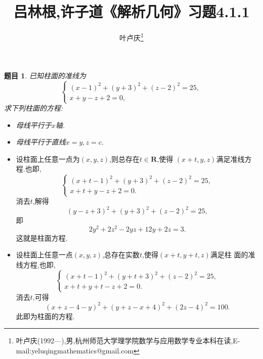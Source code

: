 \documentclass[a4paper]{article}
\newtheorem*{exe}{题目}
\newenvironment{exercise}
{\bigskip\begin{mdframed}\begin{exe}}
    {\end{exe}\end{mdframed}\bigskip}
\begin{document}
\title{\huge{\bf{吕林根,许子道《解析几何》习题4.1.1}}} \author{\small{叶卢庆\footnote{叶卢庆(1992---),男,杭州师范大学理学院数学与应用数学专业本科在读,E-mail:yeluqingmathematics@gmail.com}}}
\maketitle
\begin{exercise}
已知柱面的准线为
$$
\begin{cases}
  (x-1)^2+(y+3)^2+(z-2)^2=25,\\
x+y-z+2=0,
\end{cases}
$$
求下列柱面的方程:
\begin{itemize}
\item 母线平行于$x$轴.
\item 母线平行于直线$x=y,z=c$.
\end{itemize}
\end{exercise}
\begin{itemize}
\item 设柱面上任意一点为$(x,y,z)$,则总存在$t\in \mathbf{R}$,使得
  $(x+t,y,z)$满足准线方程.也即,
$$
\begin{cases}
  (x+t-1)^2+(y+3)^2+(z-2)^2=25,\\
x+t+y-z+2=0.
\end{cases}
$$
消去$t$,解得
$$
(y-z+3)^2+(y+3)^2+(z-2)^2=25,
$$
即
$$
2y^2+2z^2-2yz+12y+2z=3.
$$
这就是柱面方程.
\item 设柱面上任意一点$(x,y,z)$,总存在实数$t$,使得$(x+t,y+t,z)$满足柱
  面的准线方程,也即,
$$
\begin{cases}
  (x+t-1)^2+(y+t+3)^2+(z-2)^2=25,\\
x+t+y+t-z+2=0.
\end{cases}
$$
消去$t$,可得
$$
(x+z-4-y)^2+(y+z-x+4)^2+(2z-4)^2=100.
$$
此即为柱面的方程.
\end{itemize}
\end{document}
